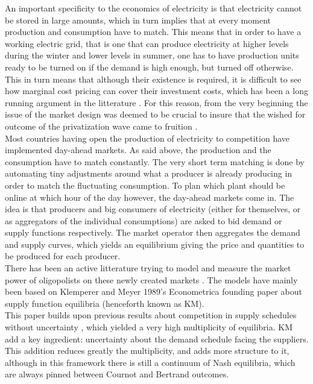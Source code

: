 An important specificity to the economics of electricity is that electricity cannot be stored in large amounts, which in turn implies that at every moment production and consumption have to match. This means that in order to have a working electric grid, that is one that can produce electricity at higher levels during the winter and lower levels in summer, one has to have production units ready to be turned on if the demand is high enough, but turned off otherwise. This in turn means that although their existence is required, it is difficult to see how marginal cost pricing can cover their investment costs, which has been a long running argument in the litterature \cite{boiteux1960peak}. For this reason, from the very beginning the issue of the market design was deemed to be crucial to insure that the wished for outcome of the privatization wave came to fruition \cite{green1991reshaping}. \\

Most countries having open the production of electricity to competition have implemented day-ahead markets. As said above, the production and the consumption have to match constantly. The very short term matching is done by automating tiny adjustments around what a producer is already producing in order to match the fluctuating consumption. To plan which plant should be online at which hour of the day however, the day-ahead markets come in. The idea is that producers and big consumers of electricity (either for themselves, or as aggregators of the individual consumptions) are asked to bid demand or supply functions respectively. The market operator then aggregates the demand and supply curves, which yields an equilibrium giving the price and quantities to be produced for each producer.  \\

There has been an active litterature trying to model and measure the market power of oligopolists on these newly created markets \cite{Newgreen, newbery1998competition, green1999electricity}. The models have mainly been based on Klemperer and Meyer 1989's Econometrica founding paper about supply function equilibria \cite{KM} (henceforth known as KM). \\

This paper builds upon previous results about competition in supply schedules without uncertainty \cite{grossman1981nash}, which yielded a very high multiplicity of equilibria. KM add a key ingredient: uncertainty about the demand schedule facing the suppliers. This addition reduces greatly the multiplicity, and adds more structure to it, although in this framework there is still a continuum of Nash equilibria, which are always pinned between Cournot and Bertrand outcomes. \\

